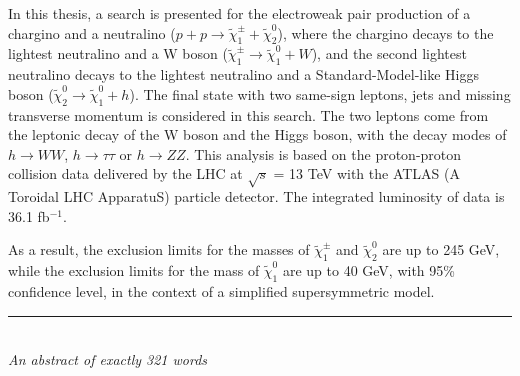 In this thesis, a search is presented for the electroweak pair production of a chargino and a neutralino ($p + p \rightarrow \tilde{\chi}_1^\pm + \tilde{\chi}_2^0$),
where the chargino decays to the lightest neutralino and a W boson ($\tilde{\chi}_1^\pm \rightarrow \tilde{\chi}_1^0 + W$),
and the second lightest neutralino decays to the lightest neutralino and a Standard-Model-like Higgs boson ($\tilde{\chi}_2^0 \rightarrow \tilde{\chi}_1^0 + h$).
The final state with two same-sign leptons, jets and missing transverse momentum is considered in this search.
The two leptons come from the leptonic decay of the W boson and the Higgs boson, with the decay modes of  $h \rightarrow WW$, $h \rightarrow \tau \tau$ or $h \rightarrow ZZ$.
This analysis is based on the proton-proton collision data delivered by the LHC at $\sqrt{s}$ = 13 TeV with the ATLAS (A Toroidal LHC ApparatuS) particle detector.
The integrated luminosity of data is 36.1 fb$^{-1}$.

As a result, the exclusion limits for the masses of $\tilde{\chi}_1^\pm$ and $\tilde{\chi}_2^0$ are up to 245 GeV, while the exclusion limits for the mass of $\tilde{\chi}_1^0$ are up to 40 GeV, with 95\% confidence level, in the context of a simplified supersymmetric model.

\bigskip

\begin{center}

\rule{6cm}{0.025cm}\\
{\slshape An abstract of exactly 321 words}

\end{center}
